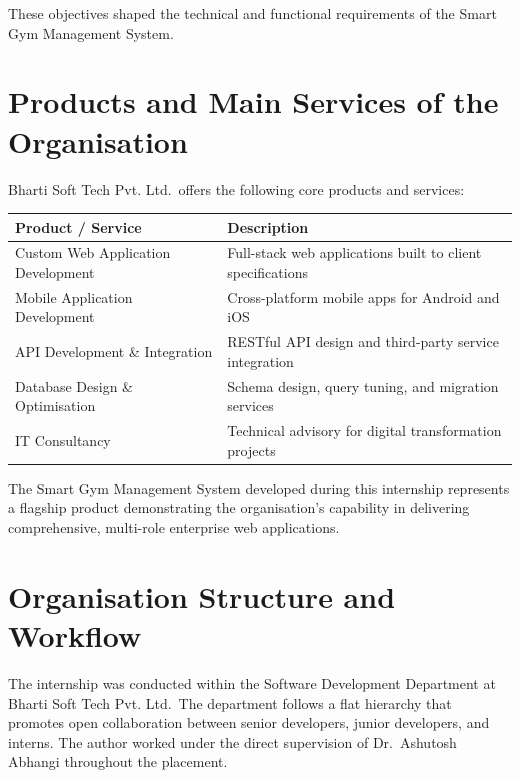 \documentclass[
  12pt,
  a4paperpaper,
]{report}
\begin{document}
These objectives shaped the technical and functional requirements of the Smart Gym Management System.


\section{Products and Main Services of the
Organisation}\label{products-and-main-services-of-the-organisation}

Bharti Soft Tech Pvt. Ltd.~offers the following core products and
services:

\noindent\begin{tabularx}{\textwidth}{|p{5.2cm}|X|}
\hline
\textbf{Product / Service} & \textbf{Description} \\
\hline

Custom Web Application Development & Full-stack web applications built to client specifications \\[4pt]
\hline
Mobile Application Development & Cross-platform mobile apps for Android and iOS \\[4pt]
\hline
API Development \& Integration & RESTful API design and third-party service integration \\[4pt]
\hline
Database Design \& Optimisation & Schema design, query tuning, and migration services \\[4pt]
\hline
IT Consultancy & Technical advisory for digital transformation projects \\
\hline
\end{tabularx}

\medskip

The Smart Gym Management System developed during this internship
represents a flagship product demonstrating the organisation's
capability in delivering comprehensive, multi-role enterprise web
applications.


\section{Organisation Structure and
Workflow}\label{organisation-structure-and-workflow}

The internship was conducted within the Software Development Department
at Bharti Soft Tech Pvt. Ltd.~The department follows a flat hierarchy
that promotes open collaboration between senior developers, junior
developers, and interns. The author worked under the direct supervision
of Dr.~Ashutosh Abhangi throughout the placement.
\end{document}
